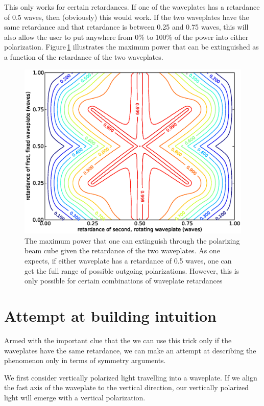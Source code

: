 This only works for certain retardances. If one of the waveplates has a retardance of 0.5 waves, then (obviously) this would work. If the two waveplates have the same retardance and that retardance is between 0.25 and 0.75 waves, this will also allow the user to put anywhere from 0\% to 100\% of the power into either polarization. Figure\,\ref{asymmetric} illustrates the maximum power that can be extinguished as a function of the retardance of the two waveplates.


\begin{figure}
    \centerline{\includegraphics{NewNotesAsymmetricFigure}}
    \caption[Maximum extinguished power for various combinations of retardances]{\label{asymmetric}
   The maximum power that one can extinguish through the polarizing beam cube given the retardance of the two waveplates. As one expects, if either waveplate has a retardance of 0.5 waves, one can get the full range of possible outgoing polarizations. However, this is only possible for certain combinations of waveplate retardances}
\end{figure}

\section{Attempt at building intuition}

Armed with the important clue that the we can use this trick only if the waveplates have the same retardance, we can make an attempt at describing the phenomenon only in terms of symmetry arguments.

We first consider vertically polarized light travelling into a waveplate. If we align the fast axis of the waveplate to the vertical direction, our vertically polarized light will emerge with a vertical polarization. 

